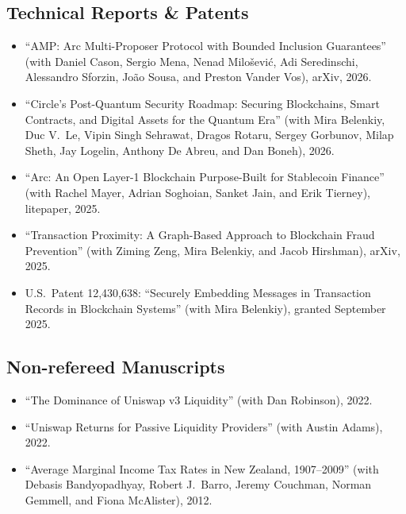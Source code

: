 \documentclass[10.5pt]{article}
\newenvironment{pubs}{\begin{itemize}[leftmargin=0pt,itemindent=0pt,labelsep=0pt,label={},itemsep=3pt,topsep=2pt]}{\end{itemize}}
\begin{document}
\subsection{Technical Reports \& Patents}
\begin{pubs}
\item ``AMP: Arc Multi-Proposer Protocol with Bounded Inclusion Guarantees'' (with Daniel Cason, Sergio Mena, Nenad Milo\v{s}evi\'c, Adi Seredinschi, Alessandro Sforzin, Jo\~ao Sousa, and Preston Vander Vos), arXiv, 2026.
\item ``Circle's Post-Quantum Security Roadmap: Securing Blockchains, Smart Contracts, and Digital Assets for the Quantum Era'' (with Mira Belenkiy, Duc V.\ Le, Vipin Singh Sehrawat, Dragos Rotaru, Sergey Gorbunov, Milap Sheth, Jay Logelin, Anthony De Abreu, and Dan Boneh), 2026.
\item ``Arc: An Open Layer-1 Blockchain Purpose-Built for Stablecoin Finance'' (with Rachel Mayer, Adrian Soghoian, Sanket Jain, and Erik Tierney), litepaper, 2025.
\item ``Transaction Proximity: A Graph-Based Approach to Blockchain Fraud Prevention'' (with Ziming Zeng, Mira Belenkiy, and Jacob Hirshman), arXiv, 2025.
\item U.S.\ Patent 12,430,638: ``Securely Embedding Messages in Transaction Records in Blockchain Systems'' (with Mira Belenkiy), granted September 2025.
\end{pubs}

\subsection{Non-refereed Manuscripts}
\begin{pubs}
\item ``The Dominance of Uniswap v3 Liquidity'' (with Dan Robinson), 2022.
\item ``Uniswap Returns for Passive Liquidity Providers'' (with Austin Adams), 2022.
\item ``Average Marginal Income Tax Rates in New Zealand, 1907--2009'' (with Debasis Bandyopadhyay, Robert J.\ Barro, Jeremy Couchman, Norman Gemmell, and Fiona McAlister), 2012.
\end{pubs}
\end{document}

